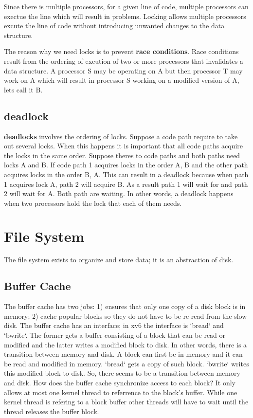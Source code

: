 \documentclass{amsbook}
\begin{document}
Since there is multiple processors, for a given line of code, multiple processors can exectue the line which will result in problems. Locking allows multiple processors excute the line of code without introducing unwanted changes to the data structure.

The reason why we need locks is to prevent \textbf{race conditions}. Race conditions result from the ordering of excution of two or more processors that invalidates a data structure. A processor S may be operating on A but then processor T may work on A which will result in processor S working on a modified version of A, lets call it B.

\subsection{deadlock}

\textbf{deadlocks} involves the ordering of locks. Suppose a code path require to take out several locks. When this happens it is important that all code paths acquire the locks in the same order. Suppose theres to code paths and both paths need locks A and B. If code path 1 acquires locks in the order A, B and the other path acquires locks in the order B, A. This can result in a deadlock because when path 1 acquires lock A, path 2 will acquire B. As a result path 1 will wait for and path 2 will wait for A. Both path are waiting. In other words, a deadlock happens when two processors hold the lock that each of them needs.

\section{File System}
The file system exists to organize and store data; it is an abstraction of disk.

\subsection{Buffer Cache}

The buffer cache has two jobs: 1) ensures that only one copy of a disk block is in memory; 2) cache popular blocks so they do not have to be re-read from the slow disk. The buffer cache has an interface; in xv6 the interface is `bread` and `bwrite`. The former gets a buffer consisting of a block that can be read or modified and the latter writes a modified block to disk. In other words, there is a transition between memory and disk. A block can first be in memory and it can be read and modified in memory. `bread` gets a copy of such block. `bwrite` writes this modified block to disk. So, there seems to be a transition between memory and disk. How does the buffer cache synchronize access to each block? It only allows at most one kernel thread to referrence to the block's buffer. While one kernel thread is refering to a block buffer other threads will have to wait until the thread releases the buffer block.
\end{document}
